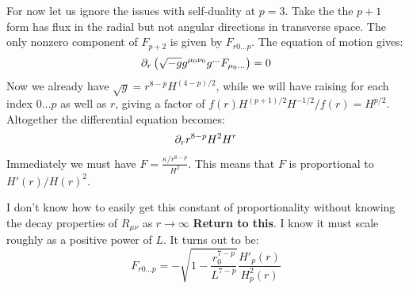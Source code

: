 \documentclass[11pt, class=article, crop=false]{standalone}
\begin{document}
\begin{enumerate}
	
	For now let us ignore the issues with self-duality at $p=3$. Take the the $p+1$ form has flux in the radial but not angular directions in transverse space.  The only nonzero component of $F_{p+2}$ is given by $F_{r 0 \dots p}$. The equation of motion gives:
	\[
		\partial_r\left(\sqrt{-g} g^{\mu_0 \nu_0} g^{\dots} F_{\mu_0 \dots} \right) = 0 
	\]
	Now we already have $\sqrt{g} = r^{8-p} H^{(4-p)/2}$, while we will have raising for each index $0 \dots p$ as well as $r$, giving a factor of $f(r) H^{(p+1)/2} H^{-1/2} / f(r) = H^{p/2}$. Altogether the differential equation becomes:
	\[
		\partial_r r^{8-p} H^2 H^r
	\]
	Immediately we must have $F = \frac{\kappa/r^{8-p}}{H^2}$. This means that $F$ is proportional to $H'(r)/H(r)^2$. 
	
	I don't know how to easily get this constant of proportionality without knowing the decay properties of $R_{\mu \nu}$ as $r \to \infty$ \textbf{Return to this}. I know it must scale roughly as a positive power of $L$. It turns out to be:
	\[
		F_{r 0\dots p} = - \sqrt{1- \frac{r_0^{7-p}}{L^{7-p}}} \frac{H'_p(r)}{H^2_p(r)}
	\]
	

\end{enumerate}
\end{document}
